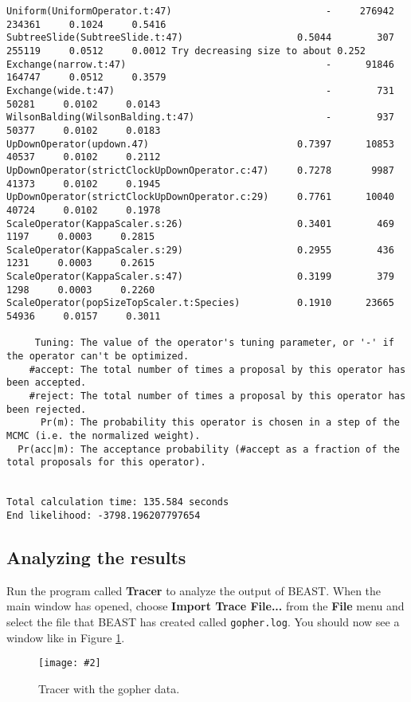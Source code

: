 \documentclass{article}
\newcommand{\includeimage}[2][]{%
\texttt{[image: \#2]}
}
\begin{document}
{\begin{verbatim}
Uniform(UniformOperator.t:47)                           -     276942     234361     0.1024     0.5416 
SubtreeSlide(SubtreeSlide.t:47)                    0.5044        307     255119     0.0512     0.0012 Try decreasing size to about 0.252
Exchange(narrow.t:47)                                   -      91846     164747     0.0512     0.3579 
Exchange(wide.t:47)                                     -        731      50281     0.0102     0.0143 
WilsonBalding(WilsonBalding.t:47)                       -        937      50377     0.0102     0.0183 
UpDownOperator(updown.47)                          0.7397      10853      40537     0.0102     0.2112 
UpDownOperator(strictClockUpDownOperator.c:47)     0.7278       9987      41373     0.0102     0.1945 
UpDownOperator(strictClockUpDownOperator.c:29)     0.7761      10040      40724     0.0102     0.1978 
ScaleOperator(KappaScaler.s:26)                    0.3401        469       1197     0.0003     0.2815 
ScaleOperator(KappaScaler.s:29)                    0.2955        436       1231     0.0003     0.2615 
ScaleOperator(KappaScaler.s:47)                    0.3199        379       1298     0.0003     0.2260 
ScaleOperator(popSizeTopScaler.t:Species)          0.1910      23665      54936     0.0157     0.3011 

     Tuning: The value of the operator's tuning parameter, or '-' if the operator can't be optimized.
    #accept: The total number of times a proposal by this operator has been accepted.
    #reject: The total number of times a proposal by this operator has been rejected.
      Pr(m): The probability this operator is chosen in a step of the MCMC (i.e. the normalized weight).
  Pr(acc|m): The acceptance probability (#accept as a fraction of the total proposals for this operator).


Total calculation time: 135.584 seconds
End likelihood: -3798.196207797654
\end{verbatim}}

\subsection*{Analyzing the results}

Run the program called {\bf Tracer} to analyze the output of BEAST. When the main
window has opened, choose {\bf Import Trace File...} from the {\bf File} menu and select the file that
BEAST has created called \texttt{gopher.log}.
You should now see a window like in Figure \ref{fig.tracer1}.

\begin{figure}
\centering
\includeimage[scale=0.4]{figures/Tracer1}

\caption{\label{fig.tracer1} Tracer with the gopher data.}
\end{figure}
\end{document}
